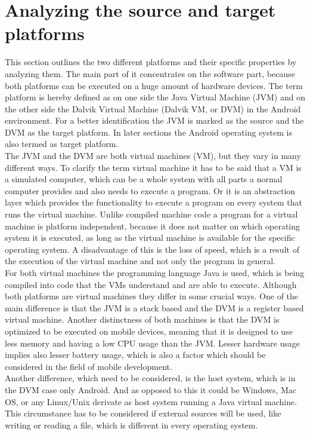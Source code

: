 \section{Analyzing the source and target platforms} 
\label{sec:migration:analysing-the-source-and-target-platform}
This section outlines the two different platforms and their specific properties by analyzing them.
The main part of it concentrates on the software part, because both platforms can be executed on a huge amount of hardware devices.
The term platform is hereby defined as on one side the Java Virtual Machine (JVM) and on the other side the Dalvik Virtual Machine (Dalvik VM, or DVM) in the Android environment.
For a better identification the JVM is marked as the source and the DVM as the target platform.
In later sections the Android operating system is also termed as target platform.
\\
The JVM and the DVM are both virtual machines (VM), but they vary in many different ways.
To clarify the term virtual machine it has to be said that a VM is a simulated computer, which can be a whole system with all parts a normal computer provides and also needs to execute a program.
Or it is an abstraction layer which provides the functionality to execute a program on every system that runs the virtual machine.
Unlike compiled machine code a program for a virtual machine is platform independent, because it does not matter on which operating system it is executed, as long as the virtual machine is available for the specific operating system.
A disadvantage of this is the loss of speed, which is a result of the execution of the virtual machine and not only the program in general.~\cite{craig2006virtual}
\\
For both virtual machines the programming language Java is used, which is being compiled into code that the VMs understand and are able to execute.
Although both platforms are virtual machines they differ in some crucial ways.
One of the main difference is that the JVM is a stack based and the DVM is a register based virtual machine.
Another distinctness of both machines is that the DVM is optimized to be executed on mobile devices, meaning that it is designed to use less memory and having a low CPU usage than the JVM.
Lesser hardware usage implies also lesser battery usage, which is also a factor which should be considered in the field of mobile development.\\
Another difference, which need to be considered, is the host system, which is in the DVM case only Android.
And as opposed to this it could be Windows, Mac OS, or any Linux/Unix derivate as host system running a Java virtual machine. 
This circumstance has to be considered if external sources will be used, like writing or reading a file, which is different in every operating system.


